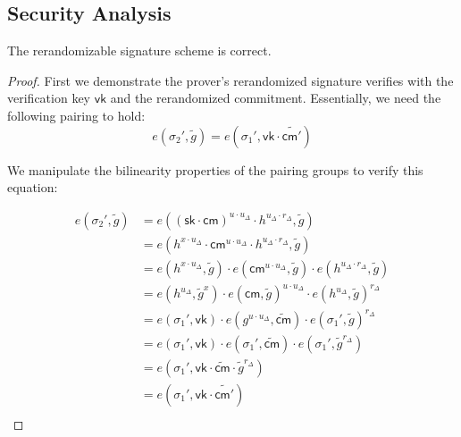\subsection{Security Analysis}

\begin{theorem}
The rerandomizable signature scheme is correct.
\end{theorem}


\begin{proof}
First we demonstrate the prover's rerandomized signature verifies with the verification key $\mathsf{vk}$ and the rerandomized commitment. Essentially, we need the following pairing to hold:
\[
    e(\sigma_2', \tilde{g}) = e(\sigma_1', \mathsf{vk} \cdot \widetilde{\mathsf{cm}'})
\]

We manipulate the bilinearity properties of the pairing groups to verify this equation:
    
\begin{align*}
    e(\sigma_2', \tilde{g}) &= e((\mathsf{sk} \cdot \mathsf{cm})^{u \cdot u_\Delta} \cdot h^{u_\Delta \cdot r_\Delta}, \tilde{g}) \\
    &= e(h^{x \cdot u_\Delta} \cdot \mathsf{cm}^{u \cdot u_\Delta} \cdot h^{u_\Delta \cdot r_\Delta}, \tilde{g}) \\
    &= e(h^{x \cdot u_\Delta}, \tilde{g}) \cdot e(\mathsf{cm}^{u \cdot u_\Delta}, \tilde{g}) \cdot e(h^{u_\Delta \cdot r_\Delta}, \tilde{g}) \\
    &= e(h^{u_\Delta}, \tilde{g}^x) \cdot e(\mathsf{cm}, \tilde{g})^{u \cdot u_\Delta} \cdot e(h^{u_\Delta}, \tilde{g})^{r_\Delta} \\
    &= e(\sigma_1', \mathsf{vk}) \cdot e(g^{u \cdot u_\Delta}, \widetilde{\mathsf{cm}}) \cdot e(\sigma_1', \tilde{g})^{r_\Delta} \\
    &= e(\sigma_1', \mathsf{vk}) \cdot e(\sigma_1', \widetilde{\mathsf{cm}}) \cdot e(\sigma_1', \tilde{g}^{r_\Delta}) \\
    &= e(\sigma_1', \mathsf{vk} \cdot \widetilde{\mathsf{cm}} \cdot \tilde{g}^{r_\Delta}) \\
    &= e(\sigma_1', \mathsf{vk} \cdot \widetilde{\mathsf{cm}'}) \\
\end{align*}
\end{proof}

